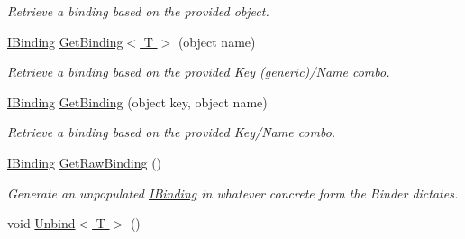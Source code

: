 \begin{DoxyCompactItemize}
\begin{DoxyCompactList}\small\item\em Retrieve a binding based on the provided object. \end{DoxyCompactList}\item 
\hypertarget{interfacestrange_1_1framework_1_1api_1_1_i_binder_a60783aa7cbbb257955fb78c189cea691}{\hyperlink{interfacestrange_1_1framework_1_1api_1_1_i_binding}{I\-Binding} \hyperlink{interfacestrange_1_1framework_1_1api_1_1_i_binder_a60783aa7cbbb257955fb78c189cea691}{Get\-Binding$<$ T $>$} (object name)}\label{interfacestrange_1_1framework_1_1api_1_1_i_binder_a60783aa7cbbb257955fb78c189cea691}

\begin{DoxyCompactList}\small\item\em Retrieve a binding based on the provided Key (generic)/\-Name combo. \end{DoxyCompactList}\item 
\hypertarget{interfacestrange_1_1framework_1_1api_1_1_i_binder_a54c2a6a2ff70790848cf090e062ee327}{\hyperlink{interfacestrange_1_1framework_1_1api_1_1_i_binding}{I\-Binding} \hyperlink{interfacestrange_1_1framework_1_1api_1_1_i_binder_a54c2a6a2ff70790848cf090e062ee327}{Get\-Binding} (object key, object name)}\label{interfacestrange_1_1framework_1_1api_1_1_i_binder_a54c2a6a2ff70790848cf090e062ee327}

\begin{DoxyCompactList}\small\item\em Retrieve a binding based on the provided Key/\-Name combo. \end{DoxyCompactList}\item 
\hypertarget{interfacestrange_1_1framework_1_1api_1_1_i_binder_aa3f5ba337aea4bed640c782ece96eb8b}{\hyperlink{interfacestrange_1_1framework_1_1api_1_1_i_binding}{I\-Binding} \hyperlink{interfacestrange_1_1framework_1_1api_1_1_i_binder_aa3f5ba337aea4bed640c782ece96eb8b}{Get\-Raw\-Binding} ()}\label{interfacestrange_1_1framework_1_1api_1_1_i_binder_aa3f5ba337aea4bed640c782ece96eb8b}

\begin{DoxyCompactList}\small\item\em Generate an unpopulated \hyperlink{interfacestrange_1_1framework_1_1api_1_1_i_binding}{I\-Binding} in whatever concrete form the Binder dictates. \end{DoxyCompactList}\item 
\hypertarget{interfacestrange_1_1framework_1_1api_1_1_i_binder_a0fcbcb628a76199699751ee7ced30acb}{void \hyperlink{interfacestrange_1_1framework_1_1api_1_1_i_binder_a0fcbcb628a76199699751ee7ced30acb}{Unbind$<$ T $>$} ()}\label{interfacestrange_1_1framework_1_1api_1_1_i_binder_a0fcbcb628a76199699751ee7ced30acb}


\end{DoxyCompactItemize}
